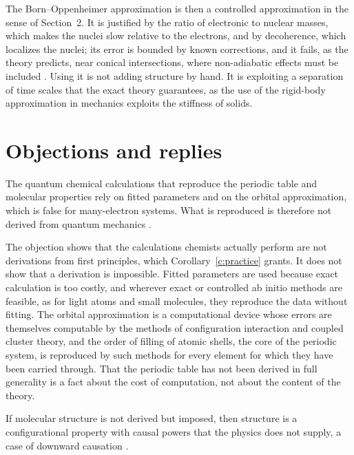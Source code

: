 \documentclass{situationist-preprint}
\begin{document}
The Born--Oppenheimer approximation is then a controlled approximation in the sense of Section~2. It is justified by the ratio of electronic to nuclear masses, which makes the nuclei slow relative to the electrons, and by decoherence, which localizes the nuclei; its error is bounded by known corrections, and it fails, as the theory predicts, near conical intersections, where non-adiabatic effects must be included \citep{SutcliffeWoolley2012}. Using it is not adding structure by hand. It is exploiting a separation of time scales that the exact theory guarantees, as the use of the rigid-body approximation in mechanics exploits the stiffness of solids.

\section{Objections and replies}

\begin{objection}\label{o:scerri}
The quantum chemical calculations that reproduce the periodic table and molecular properties rely on fitted parameters and on the orbital approximation, which is false for many-electron systems. What is reproduced is therefore not derived from quantum mechanics \citep{Scerri1994}.
\end{objection}

\begin{reply}
The objection shows that the calculations chemists actually perform are not derivations from first principles, which Corollary~\ref{c:practice} grants. It does not show that a derivation is impossible. Fitted parameters are used because exact calculation is too costly, and wherever exact or controlled ab initio methods are feasible, as for light atoms and small molecules, they reproduce the data without fitting. The orbital approximation is a computational device whose errors are themselves computable by the methods of configuration interaction and coupled cluster theory, and the order of filling of atomic shells, the core of the periodic system, is reproduced by such methods for every element for which they have been carried through. That the periodic table has not been derived in full generality is a fact about the cost of computation, not about the content of the theory.
\end{reply}

\begin{objection}\label{o:hendry}
If molecular structure is not derived but imposed, then structure is a configurational property with causal powers that the physics does not supply, a case of downward causation \citep{Hendry2006}.
\end{objection}
\end{document}
